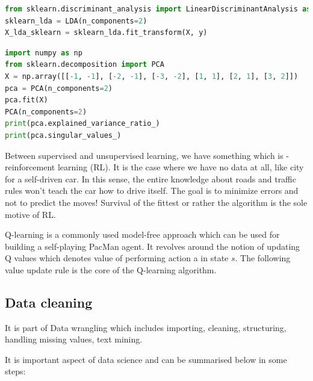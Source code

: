 \documentclass[11pt]{article}
\begin{document}
\begin{mdframed}[backgroundcolor=celadon!6]
\begin{lstlisting}[language=Python]
from sklearn.discriminant_analysis import LinearDiscriminantAnalysis as LDA
sklearn_lda = LDA(n_components=2)
X_lda_sklearn = sklearn_lda.fit_transform(X, y)
\end{lstlisting}
\end{mdframed}



\begin{mdframed}[backgroundcolor=celadon!6]
\begin{lstlisting}[language=Python]
import numpy as np
from sklearn.decomposition import PCA
X = np.array([[-1, -1], [-2, -1], [-3, -2], [1, 1], [2, 1], [3, 2]])
pca = PCA(n_components=2)
pca.fit(X)
PCA(n_components=2)
print(pca.explained_variance_ratio_)
print(pca.singular_values_)
\end{lstlisting}
\end{mdframed}


Between supervised and unsupervised learning, we have something which is - reinforcement learning (RL). 
It is the case where we have no data at all, like city for a self-driven car. In this sense, the entire
knowledge about roads and traffic rules won't teach the car how to drive itself. The goal is to minimize errors
and not to predict the moves! Survival of the fittest or rather the algorithm is the sole motive of RL. 

Q-learning is a commonly used model-free approach which can be used for building a self-playing PacMan agent. 
It revolves around the notion of updating Q values which denotes value of performing action a in state $s$. 
The following value update rule is the core of the Q-learning algorithm.



\subsection{Data cleaning}

It is part of  Data wrangling which includes  importing, cleaning, structuring, handling missing values, text mining. 

It is important aspect of data science and can be summarised below in some steps:
\end{document}
